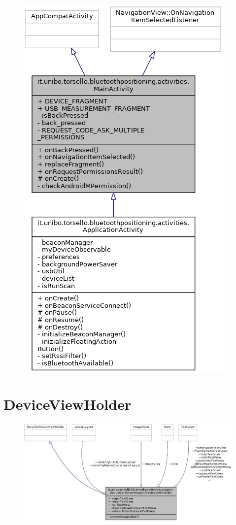 \begin{figure}[ph]
	\centering
	\includegraphics[width=0.5\linewidth]{img/uml/class/classit_1_1unibo_1_1torsello_1_1bluetoothpositioning_1_1activities_1_1MainActivity__inherit__graph.png}
	\caption{}
\end{figure}

\newpage
\section{DeviceViewHolder}
\begin{figure}[ph]
	\centering
	\includegraphics[width=1.2\linewidth]{img/uml/class/classit_1_1unibo_1_1torsello_1_1bluetoothpositioning_1_1adapter_1_1DeviceCardViewAdapter_1_1DeviceViewHolder__coll__graph.png}
	\caption{}
\end{figure}

